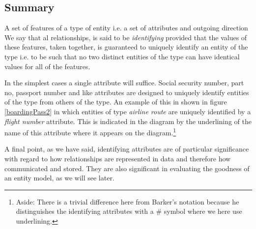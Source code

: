 \subsection{Summary}
\mynote A set of features of a type of entity i.e. a set of attributes and outgoing direction We say that al relationships, is said to be \textit{identifying} provided that the values of these features,
taken together, is guaranteed to uniquely identify an entity of the type i.e. to be such that no two distinct entities of the type can have identical values for all of the features. 

\mynote In the simplest cases a single attribute will suffice. 
Social security number, part no, 
passport number and like attributes are designed to uniquely identify entities of the type from others of the type. 
An example of this 
in  shown in figure \ref{boardingPass2} in which entities of type \textit{airline route} are uniquely identified by a \textit{flight number} attribute.
This is
indicated in the diagram  by the underlining of the name of this attribute where it appears on the diagram.\footnote{Aside: There is a trivial difference here from Barker's notation because he distinguishes the identifying attributes with a \# symbol where we here use  underlining.} 


\mynote A final point, as we have said, identifying attributes are of particular significance with regard to 
 how relationships are represented in data and therefore how communicated and stored.
They are also significant in evaluating the goodness of an entity model, as we will see later.





 
